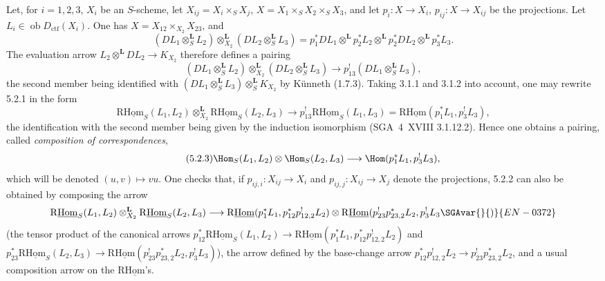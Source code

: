 Let, for $i=1,2,3$, $X_i$ be an $S$-scheme, let $X_{ij}=X_i\times_SX_j$, $X=X_1\times_SX_2\times_SX_3$, and let $p_i:X\to X_i$, $p_{ij}:X\to X_{ij}$ be the projections. Let $L_i\in\operatorname{ob}D_{\mathrm{ctf}}(X_i)$. One has $X=X_{12}\times_{X_2}X_{23}$, and
\[
(DL_1\otimes_S^{\mathbf L}L_2)\otimes_{X_2}^{\mathbf L}(DL_2\otimes_S^{\mathbf L}L_3)
=p_1^*DL_1\otimes^{\mathbf L}p_2^*L_2\otimes^{\mathbf L}p_2^*DL_2\otimes^{\mathbf L}p_3^*L_3.
\]
The evaluation arrow $L_2\otimes^{\mathbf L}DL_2\to K_{X_2}$ therefore defines a pairing
\begin{equation}
\tag{5.2.1}
(DL_1\otimes_S^{\mathbf L}L_2)\otimes_{X_2}^{\mathbf L}(DL_2\otimes_S^{\mathbf L}L_3)\longrightarrow p_{13}^!(DL_1\otimes_S^{\mathbf L}L_3),
\end{equation}
the second member being identified with $(DL_1\otimes_S^{\mathbf L}L_3)\otimes_S^{\mathbf L}K_{X_2}$ by Künneth (1.7.3). Taking 3.1.1 and 3.1.2 into account, one may rewrite 5.2.1 in the form
\begin{equation}
\tag{5.2.2}
\mathrm{R}\underline{\mathrm{Hom}}_S(L_1,L_2)\otimes_{X_2}^{\mathbf L}\mathrm{R}\underline{\mathrm{Hom}}_S(L_2,L_3)\longrightarrow p_{13}^!\mathrm{R}\underline{\mathrm{Hom}}_S(L_1,L_3)=\mathrm{R}\underline{\mathrm{Hom}}(p_1^*L_1,p_3^!L_3),
\end{equation}
the identification with the second member being given by the induction isomorphism (SGA~4~XVIII 3.1.12.2). Hence one obtains a pairing, called \emph{composition of correspondences},
\begin{equation}
\tag{5.2.3}
\Hom_S(L_1,L_2)\otimes\Hom_S(L_2,L_3)\longrightarrow\Hom(p_1^*L_1,p_3^!L_3),
\end{equation}
which will be denoted $(u,v)\mapsto vu$. One checks that, if $p_{ij,i}:X_{ij}\to X_i$ and $p_{ij,j}:X_{ij}\to X_j$ denote the projections, 5.2.2 can also be obtained by composing the arrow
\[
\mathrm{R}\underline{\mathrm{Hom}}_S(L_1,L_2)\otimes_{X_2}^{\mathbf L}\mathrm{R}\underline{\mathrm{Hom}}_S(L_2,L_3)
\longrightarrow
\mathrm{R}\underline{\mathrm{Hom}}(p_1^*L_1,p_{12}^*p_{12,2}^!L_2)
\otimes
\mathrm{R}\underline{\mathrm{Hom}}(p_{23}^!p_{23,2}^*L_2,p_3^!L_3\SGAvar{}{)}{EN-0372}
\]
(the tensor product of the canonical arrows $p_{12}^*\mathrm{R}\underline{\mathrm{Hom}}_S(L_1,L_2)\to\mathrm{R}\underline{\mathrm{Hom}}(p_1^*L_1,p_{12}^*p_{12,2}^!L_2)$ and $p_{23}^*\mathrm{R}\underline{\mathrm{Hom}}_S(L_2,L_3)\to\mathrm{R}\underline{\mathrm{Hom}}(p_{23}^!p_{23,2}^*L_2,p_3^!L_3)$), the arrow defined by the base-change arrow $p_{12}^*p_{12,2}^!L_2\to p_{23}^!p_{23,2}^*L_2$, and a usual composition arrow on the $\mathrm{R}\underline{\mathrm{Hom}}$'s.

